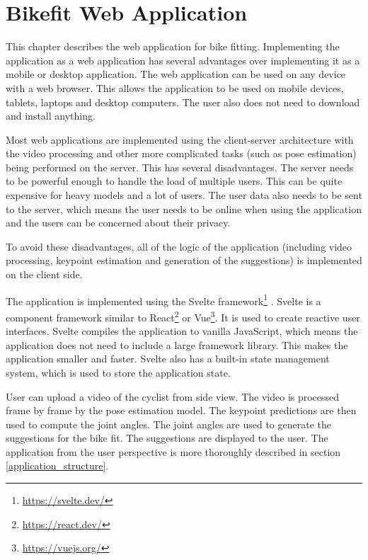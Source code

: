 
\chapter{Bikefit Web Application}
\label{ch:bikefit_application}

This chapter describes the web application for bike fitting. Implementing the application as a web application has several advantages over implementing it as a mobile or desktop application. The web application can be used on any device with a web browser. This allows the application to be used on mobile devices, tablets, laptops and desktop computers. The user also does not need to download and install anything.

Most web applications are implemented using the client-server architecture with the video processing and other more complicated tasks (such as pose estimation) being performed on the server. This has several disadvantages. The server needs to be powerful enough to handle the load of multiple users. This can be quite expensive for heavy models and a lot of users. The user data also needs to be sent to the server, which means the user needs to be online when using the application and the users can be concerned about their privacy.

To avoid these disadvantages, all of the logic of the application (including video processing, keypoint estimation and generation of the suggestions) is implemented on the client side.

The application is implemented using the Svelte framework\footnote{\url{https://svelte.dev/}} . Svelte is a component framework similar to React\footnote{\url{https://react.dev/}} or Vue\footnote{\url{https://vuejs.org/}}. It is used to create reactive user interfaces. Svelte compiles the application to vanilla JavaScript, which means the application does not need to include a large framework library. This makes the application smaller and faster. Svelte also has a built-in state management system, which is used to store the application state.

User can upload a video of the cyclist from side view. The video is processed frame by frame by the pose estimation model. The keypoint predictions are then used to compute the joint angles. The joint angles are used to generate the suggestions for the bike fit. The suggestions are displayed to the user. The application from the user perspective is more thoroughly described in section \ref{application_structure}.

